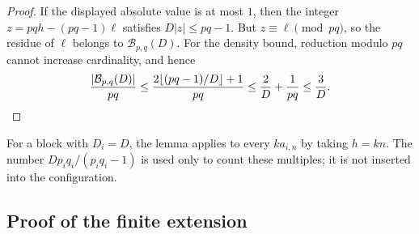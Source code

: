\documentclass[11pt,reqno]{amsart}
\theoremstyle{definition}
\theoremstyle{remark}
\numberwithin{equation}{section}
\begin{document}
\begin{proof}
If the displayed absolute value is at most $1$, then the integer
$z=pqh-(pq-1)\ell$ satisfies $D|z|\leq pq-1$. But
$z\equiv\ell\pmod{pq}$, so the residue of $\ell$ belongs to
$\mathcal B_{p,q}(D)$. For the density bound, reduction modulo $pq$
cannot increase cardinality, and hence
\[
 \frac{|\mathcal B_{p,q}(D)|}{pq}
 \leq\frac{2\lfloor(pq-1)/D\rfloor+1}{pq}
 \leq\frac2D+\frac1{pq}\leq\frac3D.\qedhere
\]
\end{proof}

For a block with $D_i=D$, the lemma applies to every $ka_{i,n}$ by
taking $h=kn$. The number $Dp_iq_i/(p_iq_i-1)$ is used only to count
these multiples; it is not inserted into the configuration.

\subsection{Proof of the finite extension}
\end{document}
